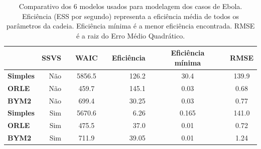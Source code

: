 \begin{table}
\centering
\begin{tabular}{@{}lrrcrrcccc@{}}\toprule
& SSVS & \phantom{ab}&  WAIC & \phantom{ab}& Eficiência & \phantom{ab}& Eficiência mínima & \phantom{ab}& RMSE\\

\midrule
\textbf{Simples} & Não &&  5856.5 && 126.2 &&  30.4 && 139.9\\ 
\textbf{ORLE} & Não &&  459.7 && 145.1  &&  0.03 && 0.68\\ 
\textbf{BYM2} & Não &&  699.4 && 30.25  && 0.03 && 0.77\\
\textbf{Simples} & Sim &&  5670.6 && 6.26 && 0.165 && 141.0\\  
\textbf{ORLE} & Sim &&  475.5  &&  37.0 && 0.01  && 0.72\\ 
\textbf{BYM2} & Sim &&  711.9 && 39.05 && 0.01 && 1.24\\

\bottomrule
\end{tabular}
    \caption{Comparativo dos 6 modelos usados para modelagem dos casos de Ebola. Eficiência (ESS por segundo) representa a eficiência média de todos os parâmetros da cadeia. Eficiência mínima é a menor eficiência encontrada. RMSE é a raiz do Erro Médio Quadrático.}
    \label{tab:posterior_summary_ebola}
\end{table}


